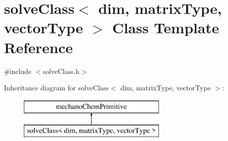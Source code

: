 \section{solve\+Class$<$ dim, matrix\+Type, vector\+Type $>$ Class Template Reference}
\label{classsolve_class}


{\ttfamily \#include $<$solve\+Class.\+h$>$}

Inheritance diagram for solve\+Class$<$ dim, matrix\+Type, vector\+Type $>$\+:\begin{figure}[H]
\begin{center}
\leavevmode
\includegraphics[height=2.000000cm]{classsolve_class}
\end{center}
\end{figure}
